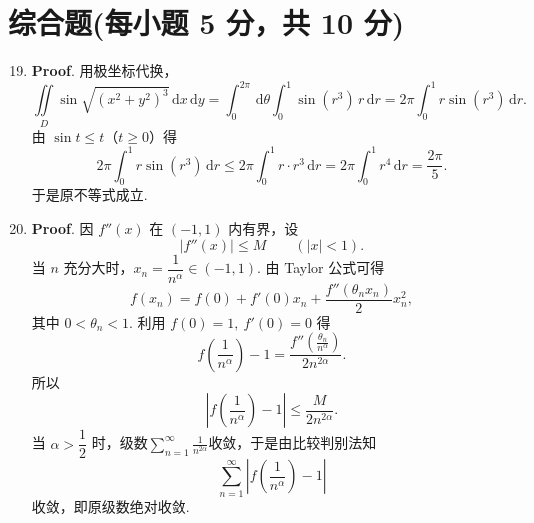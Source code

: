 \documentclass[../main.tex]{subfiles}
\begin{document}
\section{综合题(每小题 5 分，共 10 分)}
\begin{enumerate}
    \setcounter{enumi}{18}
    \item \textbf{Proof}. 用极坐标代换，
          \[
              \iint\limits_D \sin \sqrt{(x^2+y^2)^3}\,\mathrm{d}x\,\mathrm{d}y
              =\int_0^{2\pi}\,\mathrm{d}\theta\int_0^1 \sin(r^3)\,r\,\mathrm{d}r
              =2\pi\int_0^1 r\sin(r^3)\,\mathrm{d}r.
          \]
          由 \(\sin t\le t\)（\(t\ge 0\)）得
          \[
              2\pi\int_0^1 r\sin(r^3)\,\mathrm{d}r
              \le 2\pi\int_0^1 r\cdot r^3\,\mathrm{d}r
              =2\pi\int_0^1 r^4\,\mathrm{d}r
              =\frac{2\pi}{5}.
          \]
          于是原不等式成立.

    \item \textbf{Proof}. 因 \(f''(x)\) 在 \((-1,1)\) 内有界，设
          \[
              |f''(x)|\le M\qquad (|x|<1).
          \]
          当 \(n\) 充分大时，\(x_n=\dfrac{1}{n^\alpha}\in(-1,1)\). 由 Taylor 公式可得
          \[
              f(x_n)=f(0)+f'(0)x_n+\frac{f''(\theta_n x_n)}{2}x_n^2,
          \]
          其中 \(0<\theta_n<1\). 利用 \(f(0)=1,\ f'(0)=0\) 得
          \[
              f\left(\frac{1}{n^\alpha}\right)-1
              =\frac{f''\left(\frac{\theta_n}{n^\alpha}\right)}{2n^{2\alpha}}.
          \]
          所以
          \[
              \left|f\left(\frac{1}{n^\alpha}\right)-1\right|
              \le \frac{M}{2n^{2\alpha}}.
          \]
          当 \(\alpha>\dfrac12\) 时，级数$\sum_{n=1}^{\infty}\frac{1}{n^{2\alpha}}$收敛，于是由比较判别法知
          \[
              \sum_{n=1}^{\infty}\left|f\left(\frac{1}{n^\alpha}\right)-1\right|
          \]
          收敛，即原级数绝对收敛.

\end{enumerate}
\end{document}
